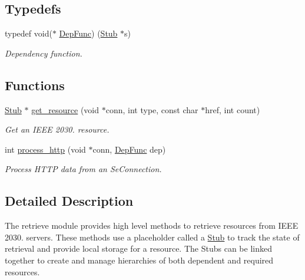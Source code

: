 \subsection*{Typedefs}
\begin{DoxyCompactItemize}
\item 
\mbox{\label{group__retrieve_ga6b78d0ec32d2700719ed6a675fd929eb}} 
typedef void($\ast$ \hyperlink{group__retrieve_ga6b78d0ec32d2700719ed6a675fd929eb}{Dep\+Func}) (\hyperlink{structStub}{Stub} $\ast$s)
\begin{DoxyCompactList}\small\item\em Dependency function. \end{DoxyCompactList}\end{DoxyCompactItemize}
\subsection*{Functions}
\begin{DoxyCompactItemize}
\item 
\hyperlink{structStub}{Stub} $\ast$ \hyperlink{group__retrieve_gaf9f86c838708d01c95a1f4f4c7c69aa1}{get\+\_\+resource} (void $\ast$conn, int type, const char $\ast$href, int count)
\begin{DoxyCompactList}\small\item\em Get an I\+E\+EE 2030. resource. \end{DoxyCompactList}\item 
int \hyperlink{group__retrieve_ga0466059a942d7af750c786d02711ca65}{process\+\_\+http} (void $\ast$conn, \hyperlink{group__retrieve_ga6b78d0ec32d2700719ed6a675fd929eb}{Dep\+Func} dep)
\begin{DoxyCompactList}\small\item\em Process H\+T\+TP data from an Se\+Connection. \end{DoxyCompactList}\end{DoxyCompactItemize}


\subsection{Detailed Description}
The retrieve module provides high level methods to retrieve resources from I\+E\+EE 2030. servers. These methods use a placeholder called a \hyperlink{structStub}{Stub} to track the state of retrieval and provide local storage for a resource. The Stubs can be linked together to create and manage hierarchies of both dependent and required resources.

